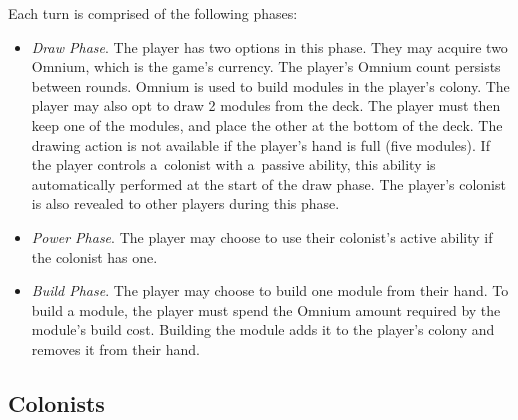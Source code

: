 Each turn is comprised of the following phases:
\begin{itemize}
    \item \emph{Draw Phase}. The player has two options in this phase.
        They may acquire two Omnium, which is the game's currency. The player's
        Omnium count persists between rounds. Omnium is used to build modules in
        the player's colony.
        The player may also opt to draw 2 modules from the deck. The player
        must then keep one of the modules, and place the other at the bottom of the deck.
        The drawing action is not available if the player's hand is full (five modules).
        If the player controls a~colonist with a~passive ability, this ability
        is automatically performed at the start of the draw phase.
        The player's colonist is also revealed to other players during this phase.
    \item \emph{Power Phase}. The player may choose to use their colonist's active
        ability if the colonist has one.
    \item \emph{Build Phase}. The player may choose to build one module from their hand.
        To build a module, the player must spend the Omnium amount required by the module's
        build cost. Building the module adds it to the player's colony and removes
        it from their hand.
\end{itemize}

\clearpage
\subsection{Colonists}
\label{gamedesign:colonists}

